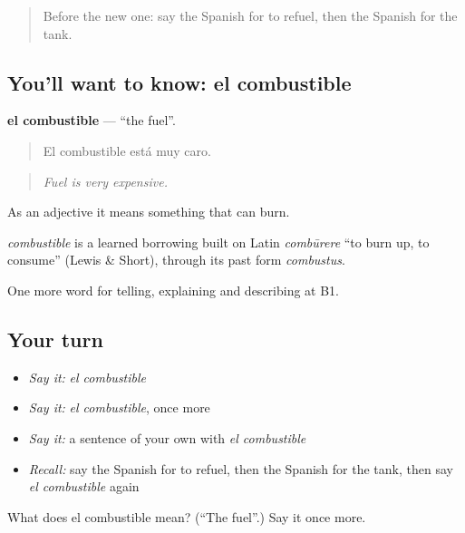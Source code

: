 \begin{quote}
Before the new one: say the Spanish for to refuel, then the Spanish for the tank.
\end{quote}

\subsection*{You'll want to know: el combustible}
\textbf{el combustible} — \textquotedblleft{}the fuel\textquotedblright{}.

\begin{quote}
El combustible está muy caro.
\end{quote}

\begin{quote}
\emph{Fuel is very expensive.}
\end{quote}

As an adjective it means something that can burn.

\begin{cousinweb}
\emph{combustible} is a learned borrowing built on Latin \emph{combūrere} \textquotedblleft{}to burn up, to consume\textquotedblright{} (Lewis \& Short), through its past form \emph{combustus}.
\end{cousinweb}

\begin{grammarlens}[title={What you've built}]
One more word for telling, explaining and describing at B1.
\end{grammarlens}

\subsection*{Your turn}
\begin{itemize}
\raggedright
  \item \emph{Say it:} \emph{el combustible}
  \item \emph{Say it:} \emph{el combustible}, once more
  \item \emph{Say it:} a sentence of your own with \emph{el combustible}
  \item \emph{Recall:} say the Spanish for to refuel, then the Spanish for the tank, then say \emph{el combustible} again
\end{itemize}

\begin{tcolorbox}[breakable,colback=teal!4,colframe=teal!35!black,title={Before you move on}]
What does el combustible mean? (\textquotedblleft{}The fuel\textquotedblright{}.) Say it once more.
\end{tcolorbox}
